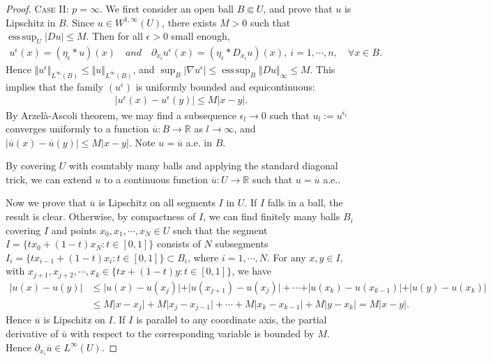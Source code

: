 \documentclass{article}
\numberwithin{equation}{section}
\newcommand{\bbR}{\mathbb{R}}
\newcommand{\ol}{\overline}
\DeclareMathOperator{\esssup}{ess\,sup}
\theoremstyle{plain}
\theoremstyle{definition}
\begin{document}
\begin{proof}
\textsc{Case II: $p=\infty$.} We first consider an open ball $B\Subset U$, and prove that $u$ is Lipschitz in $B$. Since $u\in W^{1,\infty}(U)$, there exists $M>0$ such that $\esssup_{U}\vert Du\vert\leq M$. Then for all $\epsilon>0$ small enough,
\begin{align*}
	u^\epsilon(x)=(\eta_\epsilon*u)(x)\quad and\quad \partial_{x_i} u^\epsilon(x)=(\eta_\epsilon*D_{x_i}u)(x),\ i=1,\cdots,n,\quad \forall x\in B.
\end{align*}
Hence $\Vert u^\epsilon\Vert_{L^\infty(B)}\leq\Vert u\Vert_{L^\infty(B)}$, and $\sup_B\vert\nabla u^\epsilon\vert\leq\esssup_B\Vert Du\Vert_\infty\leq M$. This implies that the family $(u^\epsilon)$ is uniformly bounded and equicontinuous:
\begin{align*}
	\vert u^\epsilon(x)-u^\epsilon(y)\vert\leq M\vert x-y\vert.
\end{align*}
By Arzelà-Ascoli theorem, we may find a subsequence $\epsilon_l\to 0$ such that $u_l:=u^{\epsilon_l}$ converges uniformly to a function $\ol{u}:B\to\bbR$ as $l\to\infty$, and $\vert\ol{u}(x)-\ol{u}(y)\vert\leq M\vert x-y\vert$. Note $u=\ol{u}$ a.e. in $B$.

By covering $U$ with countably many balls and applying the standard diagonal trick, we can extend $u$ to a continuous function $\ol{u}:U\to\bbR$ such that $u=\ol{u}$ a.e..

Now we prove that $\ol{u}$ is Lipschitz on all segments $I$ in $U$. If $I$ falls in a ball, the result is clear. Otherwise, by compactness of $I$, we can find finitely many balls $B_i$ covering $I$ and points $x_0,x_1,\cdots,x_N\in U$ such that the segment $I=\{tx_0+(1-t)x_N:t\in[0,1]\}$ consists of $N$ subsegments $I_i=\{tx_{i-1}+(1-t)x_i:t\in[0,1]\}\subset B_i$, where $i=1,\cdots,N$. For any $x,y\in I$, with $x_{j+1},x_{j+2},\cdots,x_k\in\{tx+(1-t)y:t\in[0,1]\}$, we have
\begin{align*}
	\vert u(x)-u(y)\vert&\leq\vert u(x)-u(x_j)\vert + \vert u(x_{j+1})-u(x_j)\vert +\cdots +\vert u(x_k)-u(x_{k-1})\vert + \vert u(y)-u(x_k)\vert\\
	&\leq M\vert x-x_j\vert + M\vert x_j-x_{j-1}\vert + \cdots + M\vert x_k-x_{k-1}\vert + M\vert y-x_k\vert=M\vert x-y\vert.
\end{align*}
Hence $\ol{u}$ is Lipschitz on $I$. If $I$ is parallel to any coordinate axis, the partial derivative of $\ol{u}$ with respect to the corresponding variable is bounded by $M$. Hence $\partial_{x_i}\ol{u}\in L^\infty(U)$.\vspace{0.2cm}


\end{proof}
\end{document}
